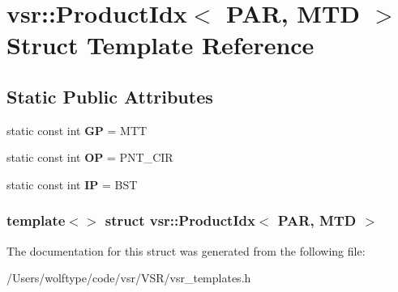 \hypertarget{structvsr_1_1_product_idx_3_01_p_a_r_00_01_m_t_d_01_4}{\section{vsr\-:\-:Product\-Idx$<$ P\-A\-R, M\-T\-D $>$ Struct Template Reference}
\label{structvsr_1_1_product_idx_3_01_p_a_r_00_01_m_t_d_01_4}
}
\subsection*{Static Public Attributes}
\begin{DoxyCompactItemize}
\item 
\hypertarget{structvsr_1_1_product_idx_3_01_p_a_r_00_01_m_t_d_01_4_a362b66b8ad192ef9955510aaef2a99ec}{static const int {\bfseries G\-P} = M\-T\-T}\label{structvsr_1_1_product_idx_3_01_p_a_r_00_01_m_t_d_01_4_a362b66b8ad192ef9955510aaef2a99ec}

\item 
\hypertarget{structvsr_1_1_product_idx_3_01_p_a_r_00_01_m_t_d_01_4_aebd24136fa0f3f8e84faea16796f6b9f}{static const int {\bfseries O\-P} = P\-N\-T\-\_\-\-C\-I\-R}\label{structvsr_1_1_product_idx_3_01_p_a_r_00_01_m_t_d_01_4_aebd24136fa0f3f8e84faea16796f6b9f}

\item 
\hypertarget{structvsr_1_1_product_idx_3_01_p_a_r_00_01_m_t_d_01_4_ad6c192678a9d3149f8a8df9bcf5a1168}{static const int {\bfseries I\-P} = B\-S\-T}\label{structvsr_1_1_product_idx_3_01_p_a_r_00_01_m_t_d_01_4_ad6c192678a9d3149f8a8df9bcf5a1168}

\end{DoxyCompactItemize}
\subsubsection*{template$<$$>$ struct vsr\-::\-Product\-Idx$<$ P\-A\-R, M\-T\-D $>$}



The documentation for this struct was generated from the following file\-:\begin{DoxyCompactItemize}
\item 
/\-Users/wolftype/code/vsr/\-V\-S\-R/vsr\-\_\-templates.\-h\end{DoxyCompactItemize}

